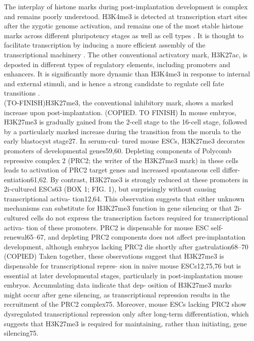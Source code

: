 The interplay of histone marks during post-implantation development is complex and remains poorly understood. H3K4me3 is detected at transcription start sites after the zygotic genome activation, and remains one of the most stable histone marks across different pluripotency stages as well as cell types \cite{XXX}. It is thought to facilitate transcription by inducing a more efficient assembly of the transcriptional machinery \cite{xxx}. The other conventional activatory mark, H3K27ac, is deposted in different types of regulatory elements, including promoters and enhancers. It is significantly more dynamic than H3K4me3 in response to internal and external stimuli, and is hence a strong candidate to regulate cell fate transitions \cite{XXX}.\\
	(TO-FINISH)H3K27me3, the conventional inhibitory mark, shows a marked increase upon post-implantation.
	(COPIED. TO FINISH) In mouse embryos, H3K27me3 is gradually gained from the 2-cell stage to the 16-cell stage, followed by a particularly marked increase during the transition from the morula to the early blastocyst stage27. In serum-cul- tured mouse ESCs, H3K27me3 decorates promoters of developmental genes59,60. Depleting components of Polycomb repressive complex 2 (PRC2; the writer of the H3K27me3 mark) in these cells leads to activation of PRC2 target genes and increased spontaneous cell differ- entiation61,62. By contrast, H3K27me3 is strongly reduced at these promoters in 2i-cultured ESCs63 (BOX 1; FIG. 1), but surprisingly without causing transcriptional activa- tion12,64. This observation suggests that either unknown mechanisms can substitute for H3K27me3 function in gene silencing or that 2i-cultured cells do not express the transcription factors required for transcriptional activa- tion of these promoters. PRC2 is dispensable for mouse ESC self-renewal65–67, and depleting PRC2 components does not affect pre-implantation development, although embryos lacking PRC2 die shortly after gastrulation68–70
	(COPIED) Taken together, these observations suggest that H3K27me3 is dispensable for transcriptional repres- sion in naive mouse ESCs12,75,76 but is essential at later developmental stages, particularly in post-implantation mouse embryos. Accumulating data indicate that dep- osition of H3K27me3 marks might occur after gene silencing, as transcriptional repression results in the recruitment of the PRC2 complex75. Moreover, mouse ESCs lacking PRC2 show dysregulated transcriptional repression only after long-term differentiation, which suggests that H3K27me3 is required for maintaining, rather than initiating, gene silencing75.


